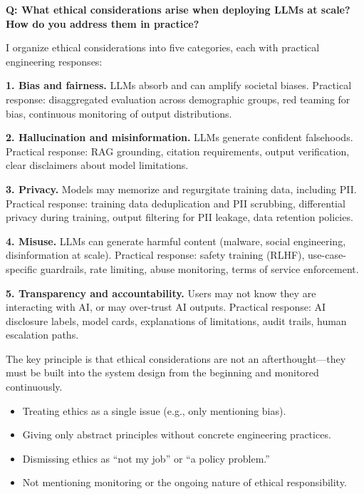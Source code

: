 \begin{interviewq}
\textbf{Q: What ethical considerations arise when deploying LLMs at scale?
How do you address them in practice?}

 \quad {} \quad \badgefreq{\freqmed}

\stronganswer
I organize ethical considerations into five categories, each with practical
engineering responses:

\textbf{1. Bias and fairness.}  LLMs absorb and can amplify societal biases.
Practical response: disaggregated evaluation across demographic groups, red
teaming for bias, continuous monitoring of output distributions.

\textbf{2. Hallucination and misinformation.}  LLMs generate confident
falsehoods.  Practical response: RAG grounding, citation requirements, output
verification, clear disclaimers about model limitations.

\textbf{3. Privacy.}  Models may memorize and regurgitate training data,
including PII.  Practical response: training data deduplication and PII
scrubbing, differential privacy during training, output filtering for PII
leakage, data retention policies.

\textbf{4. Misuse.}  LLMs can generate harmful content (malware, social
engineering, disinformation at scale).  Practical response: safety training
(RLHF), use-case-specific guardrails, rate limiting, abuse monitoring, terms
of service enforcement.

\textbf{5. Transparency and accountability.}  Users may not know they are
interacting with AI, or may over-trust AI outputs.  Practical response: AI
disclosure labels, model cards, explanations of limitations, audit trails,
human escalation paths.

The key principle is that ethical considerations are not an afterthought---they
must be built into the system design from the beginning and monitored
continuously.

\redflags
\begin{itemize}
    \item Treating ethics as a single issue (e.g., only mentioning bias).
    \item Giving only abstract principles without concrete engineering
    practices.
    \item Dismissing ethics as ``not my job'' or ``a policy problem.''
    \item Not mentioning monitoring or the ongoing nature of ethical
    responsibility.
\end{itemize}


\end{interviewq}
